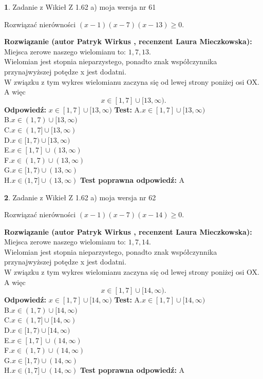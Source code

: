 \documentclass[12pt, a4paper]{article}
\theoremstyle{definition} %
\newtheorem{zad}{}
\newcommand{\zadStart}[1]{\begin{zad}#1\newline}
\newcommand{\zadStop}{\end{zad}}
\newcommand{\rozwStart}[2]{\noindent \textbf{Rozwiązanie (autor #1 , recenzent #2): }\newline}
\newcommand{\rozwStop}{\newline}
\newcommand{\odpStart}{\noindent \textbf{Odpowiedź:}\newline}
\newcommand{\odpStop}{\newline}
\newcommand{\testStart}{\noindent \textbf{Test:}\newline}
\newcommand{\testStop}{\newline}
\newcommand{\kluczStart}{\noindent \textbf{Test poprawna odpowiedź:}\newline}
\newcommand{\kluczStop}{\newline}
\begin{document}
\zadStart{Zadanie z Wikieł Z 1.62 a) moja wersja nr 61}

Rozwiązać nierówności $(x-1)(x-7)(x-13)\ge0$.
\zadStop
\rozwStart{Patryk Wirkus}{Laura Mieczkowska}
Miejsca zerowe naszego wielomianu to: $1, 7, 13$.\\
Wielomian jest stopnia nieparzystego, ponadto znak współczynnika przy\linebreak najwyższej potędze x jest dodatni.\\ W związku z tym wykres wielomianu zaczyna się od lewej strony poniżej osi OX. A więc $$x \in [1,7] \cup [13,\infty).$$
\rozwStop
\odpStart
$x \in [1,7] \cup [13,\infty)$
\odpStop
\testStart
A.$x \in [1,7] \cup [13,\infty)$\\
B.$x \in (1,7) \cup [13,\infty)$\\
C.$x \in (1,7] \cup [13,\infty)$\\
D.$x \in [1,7) \cup [13,\infty)$\\
E.$x \in [1,7] \cup (13,\infty)$\\
F.$x \in (1,7) \cup (13,\infty)$\\
G.$x \in [1,7) \cup (13,\infty)$\\
H.$x \in (1,7] \cup (13,\infty)$
\testStop
\kluczStart
A
\kluczStop



\zadStart{Zadanie z Wikieł Z 1.62 a) moja wersja nr 62}

Rozwiązać nierówności $(x-1)(x-7)(x-14)\ge0$.
\zadStop
\rozwStart{Patryk Wirkus}{Laura Mieczkowska}
Miejsca zerowe naszego wielomianu to: $1, 7, 14$.\\
Wielomian jest stopnia nieparzystego, ponadto znak współczynnika przy\linebreak najwyższej potędze x jest dodatni.\\ W związku z tym wykres wielomianu zaczyna się od lewej strony poniżej osi OX. A więc $$x \in [1,7] \cup [14,\infty).$$
\rozwStop
\odpStart
$x \in [1,7] \cup [14,\infty)$
\odpStop
\testStart
A.$x \in [1,7] \cup [14,\infty)$\\
B.$x \in (1,7) \cup [14,\infty)$\\
C.$x \in (1,7] \cup [14,\infty)$\\
D.$x \in [1,7) \cup [14,\infty)$\\
E.$x \in [1,7] \cup (14,\infty)$\\
F.$x \in (1,7) \cup (14,\infty)$\\
G.$x \in [1,7) \cup (14,\infty)$\\
H.$x \in (1,7] \cup (14,\infty)$
\testStop
\kluczStart
A
\kluczStop
\end{document}
